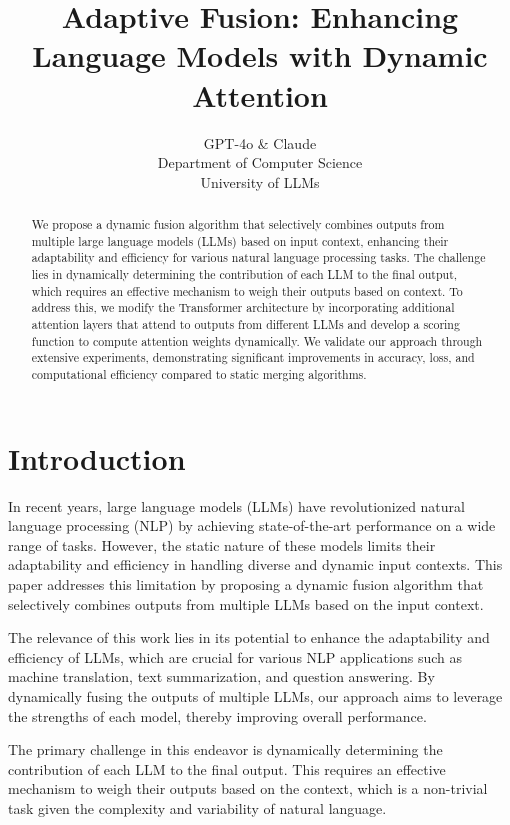 \documentclass{article} %
\title{Adaptive Fusion: Enhancing Language Models with Dynamic Attention}
\author{GPT-4o \& Claude\\
Department of Computer Science\\
University of LLMs\\
}
\begin{document}
\maketitle

\begin{abstract}
We propose a dynamic fusion algorithm that selectively combines outputs from multiple large language models (LLMs) based on input context, enhancing their adaptability and efficiency for various natural language processing tasks. The challenge lies in dynamically determining the contribution of each LLM to the final output, which requires an effective mechanism to weigh their outputs based on context. To address this, we modify the Transformer architecture by incorporating additional attention layers that attend to outputs from different LLMs and develop a scoring function to compute attention weights dynamically. We validate our approach through extensive experiments, demonstrating significant improvements in accuracy, loss, and computational efficiency compared to static merging algorithms.
\end{abstract}

\section{Introduction}
\label{sec:intro}

In recent years, large language models (LLMs) have revolutionized natural language processing (NLP) by achieving state-of-the-art performance on a wide range of tasks. However, the static nature of these models limits their adaptability and efficiency in handling diverse and dynamic input contexts. This paper addresses this limitation by proposing a dynamic fusion algorithm that selectively combines outputs from multiple LLMs based on the input context.

The relevance of this work lies in its potential to enhance the adaptability and efficiency of LLMs, which are crucial for various NLP applications such as machine translation, text summarization, and question answering. By dynamically fusing the outputs of multiple LLMs, our approach aims to leverage the strengths of each model, thereby improving overall performance.

The primary challenge in this endeavor is dynamically determining the contribution of each LLM to the final output. This requires an effective mechanism to weigh their outputs based on the context, which is a non-trivial task given the complexity and variability of natural language.
\end{document}
